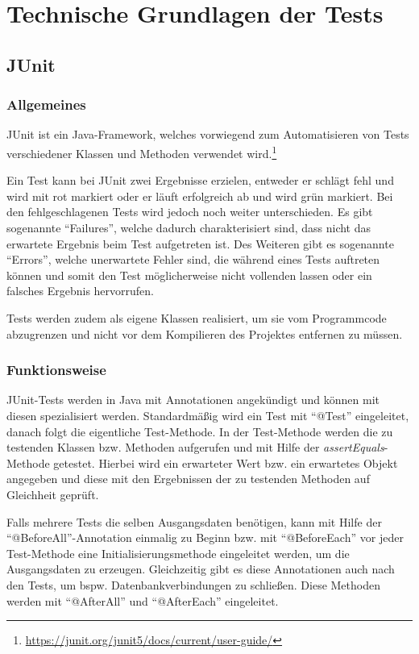 \section{Technische Grundlagen der Tests}
\authorsection{\authorRF}

\subsection{JUnit}

\subsubsection{Allgemeines}

JUnit ist ein Java-Framework, welches vorwiegend zum Automatisieren von Tests verschiedener Klassen und Methoden verwendet wird.\footnote{\url{https://junit.org/junit5/docs/current/user-guide/}}

Ein Test kann bei JUnit zwei Ergebnisse erzielen, entweder er schlägt fehl und wird mit rot markiert oder er läuft erfolgreich ab und wird grün markiert.
Bei den fehlgeschlagenen Tests wird jedoch noch weiter unterschieden.
Es gibt sogenannte \enquote{Failures}, welche dadurch charakterisiert sind, dass nicht das erwartete Ergebnis beim Test aufgetreten ist.
Des Weiteren gibt es sogenannte \enquote{Errors}, welche unerwartete Fehler sind, die während eines Tests auftreten können und somit den Test möglicherweise nicht vollenden lassen oder ein falsches Ergebnis hervorrufen.

Tests werden zudem als eigene Klassen realisiert, um sie vom Programmcode abzugrenzen und nicht vor dem Kompilieren des Projektes entfernen zu müssen.

\subsubsection{Funktionsweise}

JUnit-Tests werden in Java mit Annotationen angekündigt und können mit diesen spezialisiert werden.
Standardmäßig wird ein Test mit \enquote{@Test} eingeleitet, danach folgt die eigentliche Test-Methode.
In der Test-Methode werden die zu testenden Klassen bzw. Methoden aufgerufen und mit Hilfe der \textit{assertEquals}-Methode getestet.
Hierbei wird ein erwarteter Wert bzw. ein erwartetes Objekt angegeben und diese mit den Ergebnissen der zu testenden Methoden auf Gleichheit geprüft.

Falls mehrere Tests die selben Ausgangsdaten benötigen, kann mit Hilfe der \enquote{@BeforeAll}-Annotation einmalig zu Beginn bzw. mit \enquote{@BeforeEach} vor jeder Test-Methode eine Initialisierungsmethode eingeleitet werden, um die Ausgangsdaten zu erzeugen.
Gleichzeitig gibt es diese Annotationen auch nach den Tests, um bspw. Datenbankverbindungen zu schließen.
Diese Methoden werden mit \enquote{@AfterAll} und \enquote{@AfterEach} eingeleitet.

